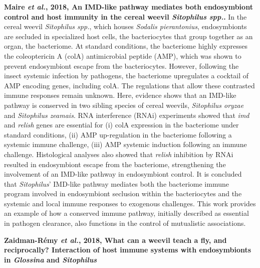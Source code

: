 \documentclass[11pt]{article}
\begin{document}
\begin{sloppypar}
\par

\textbf{Maire \textit{et al.}, 2018, An IMD-like pathway mediates both endosymbiont control and host immunity in the cereal weevil \textit{Sitophilus spp.}.} \newline
In the cereal weevil \textit{Sitophilus spp.}, which houses \textit{Sodalis pierantonius}, endosymbionts are secluded in specialized host cells, the bacteriocytes that group together as an organ, the bacteriome. 
At standard conditions, the bacteriome highly expresses the coleoptericin A (colA) antimicrobial peptide (AMP), which was shown to prevent endosymbiont escape from the bacteriocytes. 
However, following the insect systemic infection by pathogens, the bacteriome upregulates a cocktail of AMP encoding genes, including colA. 
The regulations that allow these contrasted immune responses remain unknown. 
Here, evidence shows that an IMD-like pathway is conserved in two sibling species of cereal weevils, \textit{Sitophilus oryzae} and \textit{Sitophilus zeamais}. 
RNA interference (RNAi) experiments showed that \textit{imd} and \textit{relish} genes are essential for 
(i) colA expression in the bacteriome under standard conditions, 
(ii) AMP up-regulation in the bacteriome following a systemic immune challenge, 
(iii) AMP systemic induction following an immune challenge. 
Histological analyses also showed that \textit{relish} inhibition by RNAi resulted in endosymbiont escape from the bacteriome, strengthening the involvement of an IMD-like pathway in endosymbiont control. 
It is concluded that \textit{Sitophilus}’ IMD-like pathway mediates both the bacteriome immune program involved in endosymbiont seclusion within the bacteriocytes and the systemic and local immune responses to exogenous challenges. 
This work provides an example of how a conserved immune pathway, initially described as essential in pathogen clearance, also functions in the control of mutualistic associations.

\par

\textbf{Zaidman-Rémy \textit{et al.}, 2018, What can a weevil teach a fly, and reciprocally? Interaction of host immune systems with endosymbionts in \textit{Glossina} and \textit{Sitophilus}} \newline


\end{sloppypar}
\end{document}
